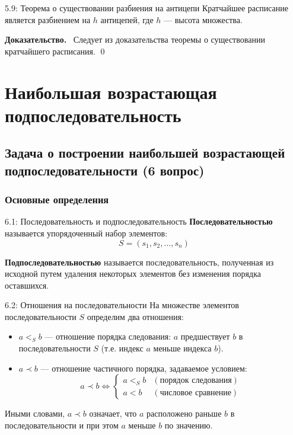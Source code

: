 \documentclass[a4paper,12pt]{article}
\newcommand{\myproof}{\textbf{Доказательство.}\ }
\begin{document}
	
	\begin{theorembox}{5.9: Теорема о существовании разбиения на антицепи}
		Кратчайшее расписание является разбиением на $h$ антицепей, где $h$ — высота множества.
	\end{theorembox}
	
	\myproof
	Следует из доказательства теоремы о существовании кратчайшего расписания. \qed
	
	
	
	
	
	
	\newpage
	\section{Наибольшая возрастающая подпоследовательность}
	
	\subsection{Задача о построении наибольшей возрастающей подпоследовательности (6 вопрос)}
	
	\subsubsection{Основные определения}
	
	\begin{definitionbox}{6.1: Последовательность и подпоследовательность}
		\textbf{Последовательностью} называется упорядоченный набор элементов:
		\[ S = (s_1, s_2, \dots, s_n) \]
		
		\textbf{Подпоследовательностью} называется последовательность, полученная из исходной путем удаления некоторых элементов без изменения порядка оставшихся.
	\end{definitionbox}
	
	\begin{definitionbox}{6.2: Отношения на последовательности}
		На множестве элементов последовательности $S$ определим два отношения:
		\begin{itemize}
			\item $a <_S b$ — отношение порядка следования: $a$ предшествует $b$ в последовательности $S$ (т.е. индекс $a$ меньше индекса $b$).
			\item $a \prec b$ — отношение частичного порядка, задаваемое условием:
			\[ a \prec b \iff \begin{cases} 
				a <_S b & (\text{порядок следования}) \\
				a < b & (\text{числовое сравнение})
			\end{cases} \]
		\end{itemize}
		
		Иными словами, $a \prec b$ означает, что $a$ расположено раньше $b$ в последовательности и при этом $a$ меньше $b$ по значению.
	\end{definitionbox}
	
\end{document}
